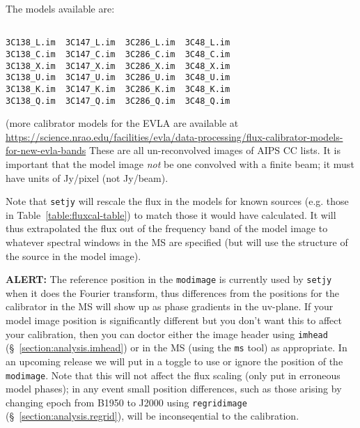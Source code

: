 The models available are:
\small
\begin{verbatim}

3C138_L.im  3C147_L.im  3C286_L.im  3C48_L.im
3C138_C.im  3C147_C.im  3C286_C.im  3C48_C.im
3C138_X.im  3C147_X.im  3C286_X.im  3C48_X.im
3C138_U.im  3C147_U.im  3C286_U.im  3C48_U.im
3C138_K.im  3C147_K.im  3C286_K.im  3C48_K.im
3C138_Q.im  3C147_Q.im  3C286_Q.im  3C48_Q.im
\end{verbatim}

(more calibrator models for the EVLA are available at\\
\url{https://science.nrao.edu/facilities/evla/data-processing/flux-calibrator-models-for-new-evla-bands}
\normalsize
These are all un-reconvolved images of AIPS CC lists.  
It is important that the model image {\em not} be one
convolved with a finite beam; it must have units of Jy/pixel (not
Jy/beam).  

Note that {\tt setjy} will rescale the flux in the models for known
sources (e.g. those in Table~\ref{table:fluxcal-table}) to match those
it would have calculated.  It will thus extrapolated the flux out of
the frequency band of the model image to whatever spectral windows
in the MS are specified (but will use the structure of the source
in the model image).

{\bf ALERT:} The reference position in the {\tt modimage} is 
currently used by {\tt setjy} when it does the Fourier transform,
thus differences from the positions for the calibrator in the MS
will show up as phase gradients in the uv-plane.  If your model
image position is significantly different but you don't want this
to affect your calibration, then you can doctor either the image
header using {\tt imhead} (\S~\ref{section:analysis.imhead})
or in the MS (using the {\tt ms} tool) as appropriate.  In an upcoming
release we will put in a toggle to use or ignore the position of
the {\tt modimage}.  Note that this will not affect the flux scaling
(only put in erroneous model phases); in any event small position
differences, such as those arising by changing epoch from B1950 to
J2000 using {\tt regridimage} (\S~\ref{section:analysis.regrid}),
will be inconseqential to the calibration.

